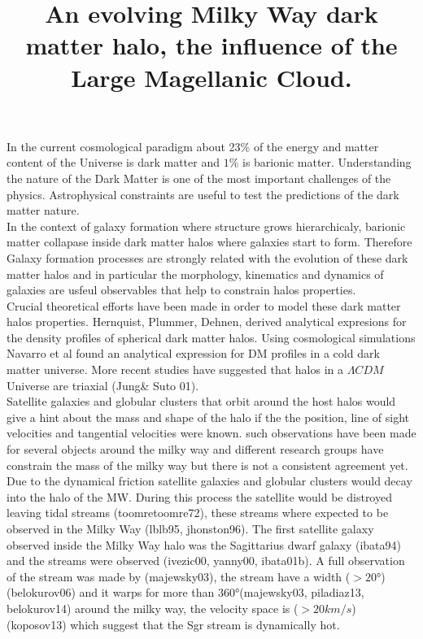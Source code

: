\documentclass[16pt]{article}
\title{\begin{LARGE}
{An evolving Milky Way dark matter halo, the influence of the Large Magellanic Cloud. }
\end{LARGE}}
\begin{document}
\date{}
\maketitle


In the current cosmological paradigm about 23\% of the energy and matter
content of the Universe is dark matter and $1\%$ is barionic matter. Understanding 
the nature of the Dark Matter is one of the most important challenges of the
physics. Astrophysical constraints are useful to test the predictions
of the dark matter nature.\\

In the context of galaxy formation where structure grows hierarchicaly, barionic matter
collapase inside dark matter halos where galaxies start to form. Therefore
Galaxy formation processes are strongly related with the evolution of these dark matter halos
and in particular the morphology, kinematics and dynamics of galaxies 
are usfeul observables that help to constrain halos properties.\\

     
Crucial theoretical efforts have been made in order to model these dark matter halos 
properties. Hernquist, Plummer, Dehnen, derived analytical expresions for the density 
profiles of spherical dark matter halos. Using cosmological simulations Navarro et al 
found an analytical expression for DM profiles in a cold dark matter universe.
More recent studies have suggested that halos in a $\Lambda CDM$ Universe are 
triaxial (Jung\& Suto 01). \\


Satellite galaxies and globular clusters that orbit around the host halos would give 
a hint about the mass and shape of the halo if the the position, line of sight velocities and 
tangential velocities were known. such observations have been made for several objects 
around the milky way and different research groups have constrain the mass of the milky way 
but there is not a consistent agreement yet.\\

Due to the dynamical friction satellite galaxies and globular clusters would decay into 
the halo of the MW. During this process the satellite would be distroyed leaving 
tidal streams (toomretoomre72), these streams where expected to be observed 
in the Milky Way (lblb95, jhonston96). 
The first satellite galaxy observed inside the Milky Way halo was the Sagittarius dwarf 
galaxy (ibata94) and the streams were observed (ivezic00, yanny00, ibata01b). 
A full observation of the stream was made by (majewsky03), the stream  
have a width ($>20°$) (belokurov06) and it warps
for more than $360°$(majewsky03, piladiaz13, belokurov14) around the milky way, 
the velocity space is ($>20km/s$) (koposov13) which suggest that
the Sgr stream is dynamically hot.  \\
\end{document}
